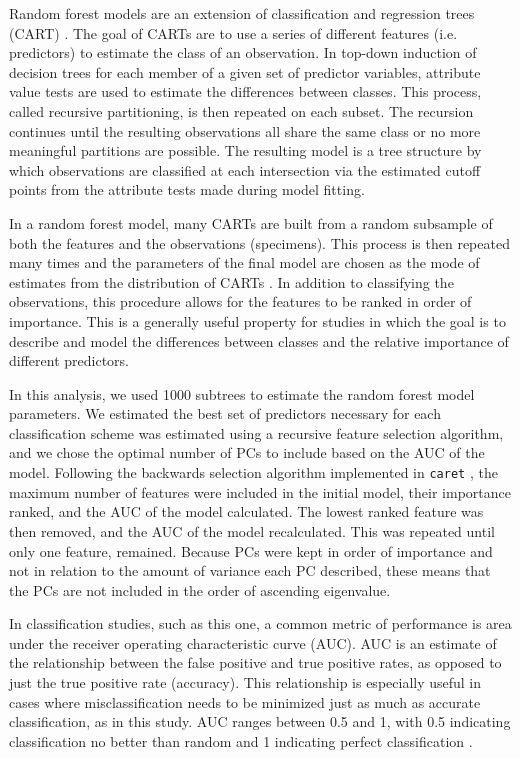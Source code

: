 \documentclass[12pt,letterpaper]{article}
\begin{document}
Random forest models are an extension of classification and regression trees (CART) \citep{Breiman1984,Breiman2001}. The goal of CARTs are to use a series of different features (i.e. predictors) to estimate the class of an observation. In top-down induction of decision trees for each member of a given set of predictor variables, attribute value tests are used to estimate the differences between classes. This process, called recursive partitioning, is then repeated on each subset. The recursion continues until the resulting observations all share the same class or no more meaningful partitions are possible. The resulting model is a tree structure by which observations are classified at each intersection via the estimated cutoff points from the attribute tests made during model fitting. %

In a random forest model, many CARTs are built from a random subsample of both the features and the observations (specimens). This process is then repeated many times and the parameters of the final model are chosen as the mode of estimates from the distribution of CARTs \citep{Breiman2001}. In addition to classifying the observations, this procedure allows for the features to be ranked in order of importance. This is a generally useful property for studies in which the goal is to describe and model the differences between classes and the relative importance of different predictors. 

In this analysis, we used 1000 subtrees to estimate the random forest model parameters. We estimated the best set of predictors necessary for each classification scheme was estimated using a recursive feature selection algorithm, and we chose the optimal number of PCs to include based on the AUC of the model. Following the backwards selection algorithm implemented in \texttt{caret} \citep{Kuhn2013}, the maximum number of features were included in the initial model, their importance ranked, and the AUC of the model calculated. The lowest ranked feature was then removed, and the AUC of the model recalculated. This was repeated until only one feature, remained. Because PCs were kept in order of importance and not in relation to the amount of variance each PC described, these means that the PCs are not included in the order of ascending eigenvalue.

In classification studies, such as this one, a common metric of performance is area under the receiver operating characteristic curve (AUC). AUC is an estimate of the relationship between the false positive and true positive rates, as opposed to just the true positive rate (accuracy). This relationship is especially useful in cases where misclassification needs to be minimized just as much as accurate classification, as in this study. AUC ranges between 0.5 and 1, with 0.5 indicating classification no better than random and 1 indicating perfect classification \citep{Hastie2009}.
\end{document}
